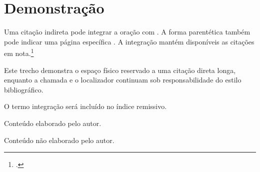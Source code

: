 \documentclass[12pt]{report}
\begin{document}
\ABNTEXtextualpages

\chapter{Demonstração}

Uma citação indireta pode integrar a oração com
\textcite{associacao2025}. A forma parentética também pode indicar uma página
específica \parencite[6]{associacao2025}. A integração mantém disponíveis as
citações em nota.\footcite[9]{associacao2023}

\begin{ABNTEXcitacaolonga}
Este trecho demonstra o espaço físico reservado a uma citação direta longa,
enquanto a chamada e o localizador continuam sob responsabilidade do estilo
bibliográfico. \parencite[10]{associacao2023}
\end{ABNTEXcitacaolonga}

O termo integração será incluído no índice remissivo.

\ABNTEXposttextualpages

\ABNTEXbibliografia


Conteúdo elaborado pelo autor.


Conteúdo não elaborado pelo autor.

\end{document}
